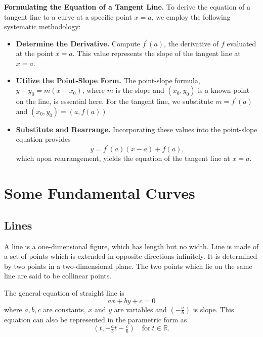 \noindent\textbf{Formulating the Equation of a Tangent Line.}
To derive the equation of a tangent line to a curve at a specific point
$x=a$, we employ the following systematic methodology:
\begin{itemize}
\item \textbf{Determine the Derivative.}
    Compute $f^{\prime}(a)$, the derivative of $f$ evaluated at the point $x=a$.
    This value represents the slope of the tangent line at $x=a$.
\item \textbf{Utilize the Point-Slope Form.}
    The point-slope formula, $y-y_{0}=m(x-x_{0})$,
    where $m$ is the slope and $(x_{0},y_{0})$ is a known point on the line, is essential here. For the tangent line,
    we substitute $m=f^{\prime}(a)$ and $(x_{0},y_{0})=(a,f(a))$
\item \textbf{Substitute and Rearrange.}
    Incorporating these values into the point-slope equation provides
    \begin{equation}
    y=f^{\prime}(a)(x-a)+f(a),\nonumber
    \end{equation}
    which upon rearrangement, yields the equation of the tangent line at $x=a$.
\end{itemize}


\section{Some Fundamental Curves}

\subsection{Lines}
A line is a one-dimensional figure, which has length but no width.
Line is made of a set of points which is extended in opposite directions infinitely.
It is determined by two points in a two-dimensional plane.
The two points which lie on the same line are said to be collinear points.

The general equation of straight line is
\begin{equation}
ax+by+c=0\nonumber
\end{equation}
where $a,b,c$ are constants, $x$ and  $y$ are variables and $(-\frac{a}{b})$ is slope.
This equation can also be represented in the parametric form as
\begin{equation}
(t,-\tfrac{a}{b}t-\tfrac{c}{b})\quad\text{for}\ t\in\mathbb{R}.\nonumber
\end{equation}


